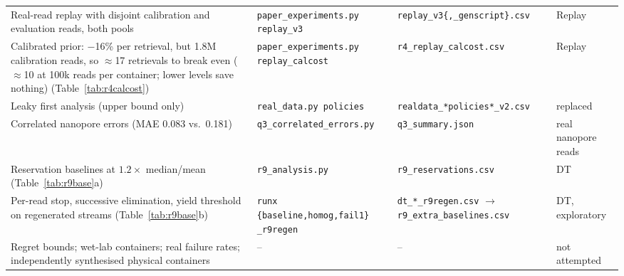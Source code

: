 \begin{table}[!t]
\begin{tabular}{@{}p{66mm}p{42mm}p{46mm}p{22mm}@{}}
Real-read replay with disjoint calibration and evaluation reads, both pools & \texttt{paper\_experiments.py replay\_v3} & \texttt{replay\_v3\{,\_genscript\}.csv} & Replay \\
Calibrated prior: $-$16\% per retrieval, but 1.8M calibration reads, so $\approx$17 retrievals to break even ($\approx$10 at 100k reads per container; lower levels save nothing) (Table~\ref{tab:r4calcost}) & \texttt{paper\_experiments.py replay\_calcost} & \texttt{r4\_replay\_calcost.csv} & Replay \\
Leaky first analysis (upper bound only) & \texttt{real\_data.py policies} & \texttt{realdata\_*policies*\_v2.csv} & replaced \\
Correlated nanopore errors (MAE 0.083 vs.\ 0.181) & \texttt{q3\_correlated\_errors.py} & \texttt{q3\_summary.json} & real nanopore reads \\
Reservation baselines at $1.2\times$ median/mean (Table~\ref{tab:r9base}a) & \texttt{r9\_analysis.py} & \texttt{r9\_reservations.csv} & DT \\
Per-read stop, successive elimination, yield threshold on regenerated streams (Table~\ref{tab:r9base}b) & \texttt{runx \{baseline,homog,fail1\} \_r9regen} & \texttt{dt\_*\_r9regen.csv} $\to$ \texttt{r9\_extra\_baselines.csv} & DT, exploratory \\
Regret bounds; wet-lab containers; real failure rates; independently synthesised physical containers & -- & -- & not attempted \\
\bottomrule
\end{tabular}
\end{table}
